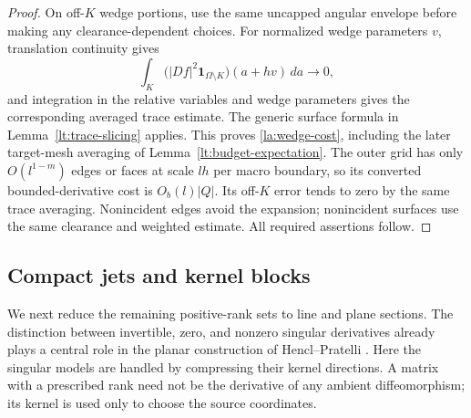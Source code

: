 \begin{proof}
On off-$K$ wedge portions, use the same uncapped angular envelope
before making any clearance-dependent choices.  For normalized wedge
parameters $v$, translation continuity gives
\[
 \int_K
  \bigl(|Df|^2\mathbf1_{\Omega\setminus K}\bigr)(a+hv)\,da
       \longrightarrow0,
\]
and integration in the relative variables and wedge parameters
gives the corresponding averaged trace estimate.  The generic
surface formula in Lemma~\ref{lt:trace-slicing} applies.  This proves
\eqref{la:wedge-cost}, including the later target-mesh averaging of
Lemma~\ref{lt:budget-expectation}.  The outer grid has only
$O(l^{1-m})$ edges or faces at scale $lh$ per macro boundary, so its
converted bounded-derivative cost is $O_b(l)|Q|$.  Its off-$K$ error
tends to zero by the same trace averaging.  Nonincident edges avoid
the expansion; nonincident surfaces use the same clearance and
weighted estimate.  All required assertions follow.
\end{proof}

\subsection{Compact jets and kernel blocks}

We next reduce the remaining positive-rank sets to line and plane
sections.  The distinction between invertible, zero, and nonzero
singular derivatives already plays a central role in the planar
construction of Hencl--Pratelli
\cite[Section~1.1 and Section~3]{HenclPratelli2018}.  Here the singular
models are handled by compressing their kernel directions.  A matrix
with a prescribed rank need not be the derivative of any ambient
diffeomorphism; its kernel is used only to choose the source coordinates.

